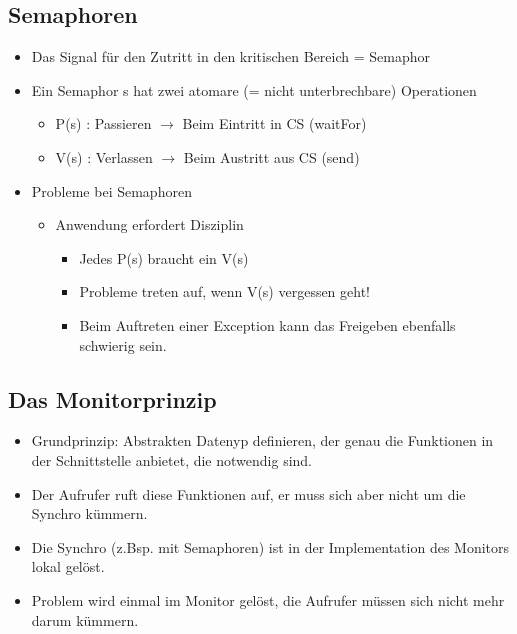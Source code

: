  \subsection{Semaphoren }
 \begin{itemize}
   \item Das Signal für den Zutritt in den kritischen Bereich = Semaphor
   \item Ein Semaphor s hat zwei atomare (= nicht unterbrechbare)
     Operationen
   \begin{itemize}
     \item P(s) : Passieren $\rightarrow$ Beim Eintritt in CS (waitFor)
     \item V(s) : Verlassen $\rightarrow$ Beim Austritt aus CS (send)
   \end{itemize}
   \item Probleme bei Semaphoren
   \begin{itemize}
    \item Anwendung erfordert Disziplin
    \begin{itemize}
      \item Jedes P(s) braucht ein V(s)
      \item Probleme treten auf, wenn V(s) vergessen geht!
      \item Beim Auftreten einer Exception kann das Freigeben ebenfalls
      schwierig sein. 
    \end{itemize}
   \end{itemize}
 \end{itemize}
 

 \subsection{Das Monitorprinzip }
 \begin{itemize}
   \item Grundprinzip: Abstrakten Datenyp definieren, der genau die Funktionen
   in der Schnittstelle anbietet, die notwendig sind. 
   \item Der Aufrufer ruft diese Funktionen auf, er muss sich aber nicht um die
   Synchro kümmern. 
   \item Die Synchro (z.Bsp. mit Semaphoren) ist in der Implementation des
   Monitors lokal gelöst. 
   \item Problem wird einmal im Monitor gelöst, die Aufrufer müssen sich nicht
   mehr darum kümmern. 
 \end{itemize}

\newpage
